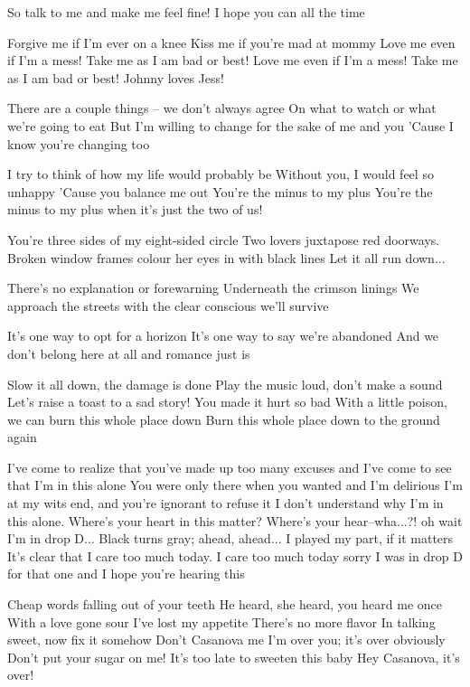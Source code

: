So talk to me and make me feel fine!
I hope you can all the time

Forgive me if I'm ever on a knee
Kiss me if you're mad at mommy
Love me even if I'm a mess!
Take me as I am bad or best!
Love me even if I'm a mess! Take me as I am bad or best!
Johnny loves Jess!

There are a couple things -- we don't always agree
On what to watch or what we're going to eat
But I'm willing to change for the sake of me and you
'Cause I know you're changing too

I try to think of how my life would probably be
Without you, I would feel so unhappy
'Cause you balance me out
You're the minus to my plus
You're the minus to my plus when it's just the two of us!


You're three sides of my eight-sided circle
Two lovers juxtapose red doorways.
Broken window frames colour her eyes in with black lines
Let it all run down...

There's no explanation or forewarning
Underneath the crimson linings
We approach the streets with the clear conscious we'll survive

It's one way to opt for a horizon
It's one way to say we're abandoned
And we don't belong here at all
and romance just is

Slow it all down, the damage is done
Play the music loud, don't make a sound
Let's raise a toast to a sad story!
You made it hurt so bad
With a little poison, we can burn this whole place down
Burn this whole place down to the ground again


I've come to realize that you've made up too many excuses
and I've come to see that I'm in this alone
You were only there when you wanted and I'm delirious
I'm at my wits end, and you're ignorant to refuse it
I don't understand why I'm in this alone.
Where's your heart in this matter?
Where's your hear--wha...?! oh wait I'm in drop D...
Black turns gray; ahead, ahead...
I played my part, if it matters
It's clear that I care too much today.
I care too much today
sorry I was in drop D for that one
and I hope you're hearing this


Cheap words falling out of your teeth
He heard, she heard, you heard me once
With a love gone sour
I've lost my appetite
There's no more flavor
In talking sweet, now fix it somehow
Don't Casanova me
I'm over you; it's over obviously
Don't put your sugar on me!
It's too late to sweeten this baby
Hey Casanova, it's over!


